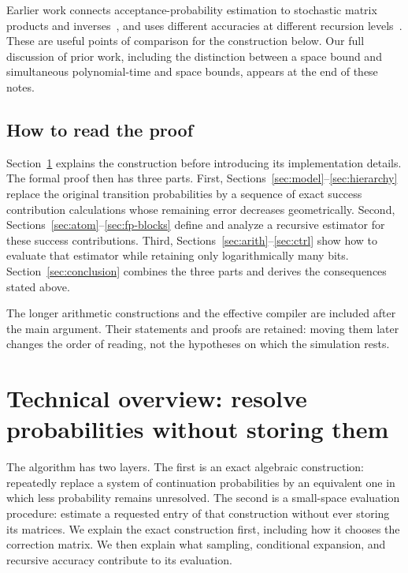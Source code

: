 \documentclass[11pt]{article}
\numberwithin{equation}{section}
\theoremstyle{definition}
\theoremstyle{remark}
\begin{document}
Earlier work connects acceptance-probability estimation to stochastic matrix products and inverses~\cite{AhmadinejadKelnerMurtaghPeeblesSidfordVadhan2020}, and uses different accuracies at different recursion levels~\cite{CohenDoronSberloTaShma2023}. These are useful points of comparison for the construction below. Our full discussion of prior work, including the distinction between a space bound and simultaneous polynomial-time and space bounds, appears at the end of these notes.

\subsection{How to read the proof}

Section~\ref{sec:overview} explains the construction before introducing its implementation details. The formal proof then has three parts. First, Sections~\ref{sec:model}--\ref{sec:hierarchy} replace the original transition probabilities by a sequence of exact success contribution calculations whose remaining error decreases geometrically. Second, Sections~\ref{sec:atom}--\ref{sec:fp-blocks} define and analyze a recursive estimator for these success contributions. Third, Sections~\ref{sec:arith}--\ref{sec:ctrl} show how to evaluate that estimator while retaining only logarithmically many bits. Section~\ref{sec:conclusion} combines the three parts and derives the consequences stated above.

The longer arithmetic constructions and the effective compiler are included after the main argument. Their statements and proofs are retained: moving them later changes the order of reading, not the hypotheses on which the simulation rests.




\section{Technical overview: resolve probabilities without storing them}
\label{sec:overview}

The algorithm has two layers. The first is an exact algebraic construction: repeatedly replace a system of continuation probabilities by an equivalent one in which less probability remains unresolved. The second is a small-space evaluation procedure: estimate a requested entry of that construction without ever storing its matrices. We explain the exact construction first, including how it chooses the correction matrix. We then explain what sampling, conditional expansion, and recursive accuracy contribute to its evaluation.
\end{document}
